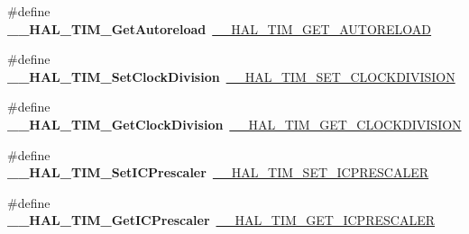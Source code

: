 \begin{DoxyCompactItemize}
\item 
\mbox{\label{group___h_a_l___t_i_m___aliased___macros_gae96afd3a280ee1faf2551537e6618ee4}} 
\#define {\bfseries \+\_\+\+\_\+\+H\+A\+L\+\_\+\+T\+I\+M\+\_\+\+Get\+Autoreload}~\hyperlink{group___t_i_m___exported___macros_gaa7a5c7645695bad15bacd402513a028a}{\+\_\+\+\_\+\+H\+A\+L\+\_\+\+T\+I\+M\+\_\+\+G\+E\+T\+\_\+\+A\+U\+T\+O\+R\+E\+L\+O\+AD}
\item 
\mbox{\label{group___h_a_l___t_i_m___aliased___macros_ga8b8f3cf144c4058ec55e6e3659c6a68f}} 
\#define {\bfseries \+\_\+\+\_\+\+H\+A\+L\+\_\+\+T\+I\+M\+\_\+\+Set\+Clock\+Division}~\hyperlink{group___t_i_m___exported___macros_ga8aa84d77c670890408092630f9b2bdc4}{\+\_\+\+\_\+\+H\+A\+L\+\_\+\+T\+I\+M\+\_\+\+S\+E\+T\+\_\+\+C\+L\+O\+C\+K\+D\+I\+V\+I\+S\+I\+ON}
\item 
\mbox{\label{group___h_a_l___t_i_m___aliased___macros_gaaf835e3864f2ba2e2026d417ad0d5e40}} 
\#define {\bfseries \+\_\+\+\_\+\+H\+A\+L\+\_\+\+T\+I\+M\+\_\+\+Get\+Clock\+Division}~\hyperlink{group___t_i_m___exported___macros_gae6bc91bb5940bce52828c690f24001b8}{\+\_\+\+\_\+\+H\+A\+L\+\_\+\+T\+I\+M\+\_\+\+G\+E\+T\+\_\+\+C\+L\+O\+C\+K\+D\+I\+V\+I\+S\+I\+ON}
\item 
\mbox{\label{group___h_a_l___t_i_m___aliased___macros_ga1cb3c9854441539ebe076fba62c36d22}} 
\#define {\bfseries \+\_\+\+\_\+\+H\+A\+L\+\_\+\+T\+I\+M\+\_\+\+Set\+I\+C\+Prescaler}~\hyperlink{group___t_i_m___exported___macros_gaeb106399b95ef02cec502f58276a0e92}{\+\_\+\+\_\+\+H\+A\+L\+\_\+\+T\+I\+M\+\_\+\+S\+E\+T\+\_\+\+I\+C\+P\+R\+E\+S\+C\+A\+L\+ER}
\item 
\mbox{\label{group___h_a_l___t_i_m___aliased___macros_gae8d82e4e04e81f7a023a45b73c9705b7}} 
\#define {\bfseries \+\_\+\+\_\+\+H\+A\+L\+\_\+\+T\+I\+M\+\_\+\+Get\+I\+C\+Prescaler}~\hyperlink{group___t_i_m___exported___macros_gabfeec6b3c67a5747c7dbd20aff61d8e2}{\+\_\+\+\_\+\+H\+A\+L\+\_\+\+T\+I\+M\+\_\+\+G\+E\+T\+\_\+\+I\+C\+P\+R\+E\+S\+C\+A\+L\+ER}
\item 
\mbox{\label{group___h_a_l___t_i_m___aliased___macros_ga03feb77e8c86f3563d671c1ec2439e76}} 

\end{DoxyCompactItemize}
